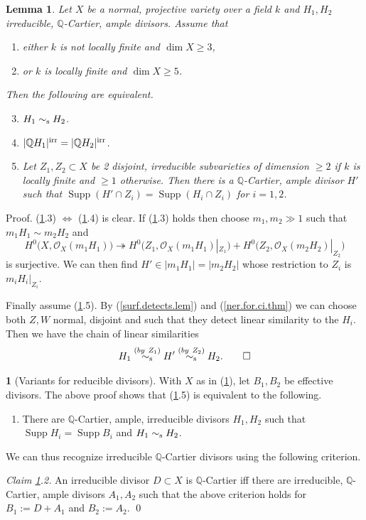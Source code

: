 \documentclass{amsart}
\newtheorem{lem}[thm]{Lemma}
\theoremstyle{definition}
\newtheorem{say}[thm]{}
\theoremstyle{remark}
\renewcommand{\o}[0]{{\mathcal O}}
\newcommand{\q}[0]{{\mathbb Q}}
\newcommand{\supp}[0]{\operatorname{Supp}}
\newcommand{\onto}[0]{\twoheadrightarrow}
\newcommand{\sims}[0]{\sim_{\rm s}}
\begin{document}
\begin{lem}\label{ample.Qiso.top.lem}
 Let $X$ be a normal, projective variety  over a field $k$ and $H_1, H_2$ irreducible, $\q$-Cartier,  ample  divisors.
Assume that  
\begin{enumerate}
\item either $k$ is not locally finite and $\dim X\geq 3$,
\item or $k$ is  locally finite and $\dim X\geq 5$.
\end{enumerate}
 Then the following are equivalent.
\begin{enumerate}\setcounter{enumi}{2}
\item   $H_1\sims H_2$.
\item $|\q H_1|^{\rm irr}=|\q H_2|^{\rm irr}$.
\item Let $Z_1, Z_2\subset X$ be 2 disjoint, irreducible subvarieties of dimension $\geq 2$ if $k$ is  locally finite and $\geq 1$ otherwise.
Then there is a $\q$-Cartier,  ample  divisor $H'$ such that
 $\supp(H'\cap Z_i)= \supp(H_i\cap Z_i)$ for $i=1,2$.
\end{enumerate}
\end{lem}

Proof. (\ref{ample.Qiso.top.lem}.3)  $\Leftrightarrow$ (\ref{ample.Qiso.top.lem}.4) is clear. 
If (\ref{ample.Qiso.top.lem}.3) holds then choose $m_1, m_2\gg 1$ such that $m_1H_1\sim m_2H_2$ and
$$
H^0\bigl(X, \o_X(m_1H_1)\bigr)\onto
H^0\bigl(Z_1, \o_X(m_1H_1)|_{Z_1}\bigr)+
H^0\bigl(Z_2, \o_X(m_2H_2)|_{Z_2}\bigr)
$$
is surjective.  We can then find $H'\in |m_1H_1|=|m_2H_2|$ whose restriction to  $Z_i$ is $m_i H_i|_{Z_i}$.

Finally assume (\ref{ample.Qiso.top.lem}.5). By (\ref{surf.detects.lem}) and (\ref{ner.for.ci.thm})  we can choose both $Z, W$ normal, disjoint  and such that they detect  linear similarity to the $H_i$.
Then we have the chain of linear similarities
$$
H_1\stackrel{(by\ Z_1)}{\sims} H'\stackrel{(by\ Z_2)}{\sims} H_2. \qed
$$


\begin{say}[Variants for reducible divisors]
\label{ample.Qiso.top.lem.var}
 With  $X$ as in (\ref{ample.Qiso.top.lem}), let  $B_1, B_2$ be effective   divisors. The above proof shows that
(\ref{ample.Qiso.top.lem}.5) is  equivalent to the following.
\begin{enumerate}
\item  There are $\q$-Cartier, ample, irreducible  divisors $H_1, H_2$ such that
$\supp H_i=\supp B_i$ and   $H_1\sims H_2$.
\end{enumerate}
We can thus recognize irreducible $\q$-Cartier divisors using the following criterion.
\medskip

{\it Claim \ref{ample.Qiso.top.lem.var}.2.} An irreducible  divisor
$D\subset X$ is $\q$-Cartier iff there are irreducible, $\q$-Cartier, ample divisors  $A_1, A_2$ such that   the above criterion holds for $B_1:=D+A_1$ and  $B_2:=A_2$. \qed
\end{say}
\end{document}

